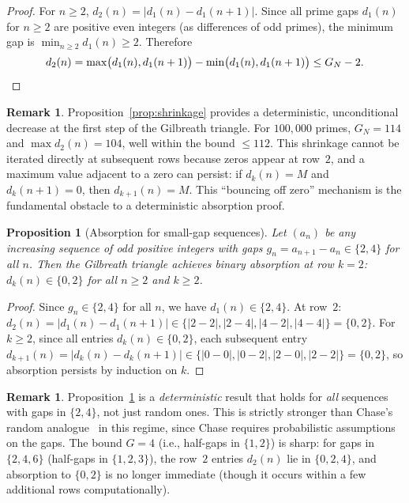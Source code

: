 \documentclass[11pt, a4paper]{amsart}
\theoremstyle{plain}
\newtheorem{proposition}[theorem]{Proposition}
\theoremstyle{definition}
\newtheorem{remark}[theorem]{Remark}
\begin{document}
\begin{proof}
For $n \ge 2$, $d_2(n) = |d_1(n) - d_1(n+1)|$. Since all prime gaps $d_1(n)$ for $n \ge 2$ are positive even
integers (as differences of odd primes), the minimum gap is $\min_{n \ge 2} d_1(n) \ge 2$. Therefore
\[
d_2(n) = \max\bigl(d_1(n), d_1(n+1)\bigr) - \min\bigl(d_1(n), d_1(n+1)\bigr) \le G_N - 2. \qedhere
\]
\end{proof}

\begin{remark}
Proposition~\ref{prop:shrinkage} provides a deterministic, unconditional decrease at the first step of the Gilbreath triangle.
For $100{,}000$ primes, $G_N = 114$ and $\max d_2(n) = 104$, well within the bound $\le 112$.
This shrinkage cannot be iterated directly at subsequent rows because zeros appear at row~$2$,
and a maximum value adjacent to a zero can persist: if $d_k(n) = M$ and $d_k(n+1) = 0$, then $d_{k+1}(n) = M$.
This ``bouncing off zero'' mechanism is the fundamental obstacle to a deterministic absorption proof.
\end{remark}

\begin{proposition}[Absorption for small-gap sequences]\label{prop:small-gap}
Let $(a_n)$ be any increasing sequence of odd positive integers with gaps $g_n = a_{n+1} - a_n \in \{2, 4\}$
for all $n$. Then the Gilbreath triangle achieves binary absorption at row $k = 2$: $d_k(n) \in \{0, 2\}$
for all $n \ge 2$ and $k \ge 2$.
\end{proposition}

\begin{proof}
Since $g_n \in \{2, 4\}$ for all $n$, we have $d_1(n) \in \{2, 4\}$.
At row~$2$: $d_2(n) = |d_1(n) - d_1(n+1)| \in \{|2-2|, |2-4|, |4-2|, |4-4|\} = \{0, 2\}$.
For $k \ge 2$, since all entries $d_k(n) \in \{0, 2\}$,
each subsequent entry $d_{k+1}(n) = |d_k(n) - d_k(n+1)| \in \{|0-0|, |0-2|, |2-0|, |2-2|\} = \{0, 2\}$,
so absorption persists by induction on $k$.
\end{proof}

\begin{remark}
Proposition~\ref{prop:small-gap} is a \emph{deterministic} result that holds for \emph{all} sequences with gaps in $\{2, 4\}$,
not just random ones. This is strictly stronger than Chase's random analogue~\cite{Chase2020} in this regime,
since Chase requires probabilistic assumptions on the gaps. The bound $G = 4$ (i.e., half-gaps in $\{1, 2\}$)
is sharp: for gaps in $\{2, 4, 6\}$ (half-gaps in $\{1, 2, 3\}$), the row~$2$ entries $d_2(n)$ lie in $\{0, 2, 4\}$,
and absorption to $\{0, 2\}$ is no longer immediate (though it occurs within a few additional rows computationally).
\end{remark}
\end{document}
